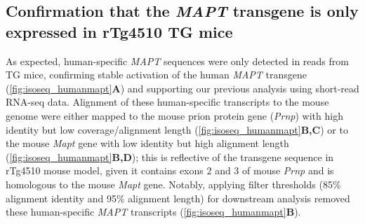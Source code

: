 \begin{figure}[p]
	\captionsetup{width=0.95\textwidth}
\end{figure}


\subsection{Confirmation that the \textit{MAPT} transgene is only expressed in rTg4510 TG mice}
\label{mapt_transgene_whole}
As expected, human-specific \textit{MAPT} sequences were only detected in reads from TG mice, confirming stable activation of the human \textit{MAPT} transgene (\cref{fig:isoseq_humanmapt}\textbf{A}) and supporting our previous analysis using short-read RNA-seq data\cite{Castanho2020}. Alignment of these human-specific transcripts to the mouse genome were either mapped to the mouse prion protein gene (\textit{Prnp}) with high identity but low coverage/alignment length (\cref{fig:isoseq_humanmapt}\textbf{B,C}) or to the mouse \textit{Mapt} gene with low identity but high alignment length (\cref{fig:isoseq_humanmapt}\textbf{B,D}); this is reflective of the transgene sequence in rTg4510 mouse model, given it contains exons 2 and 3 of mouse \textit{Prnp}\cite{Ramsden2005} and is homologous to the mouse \textit{Mapt} gene. Notably, applying filter thresholds (85\% alignment identity and 95\% alignment length) for downstream analysis removed these human-specific \textit{MAPT} transcripts (\cref{fig:isoseq_humanmapt}\textbf{B}). 

